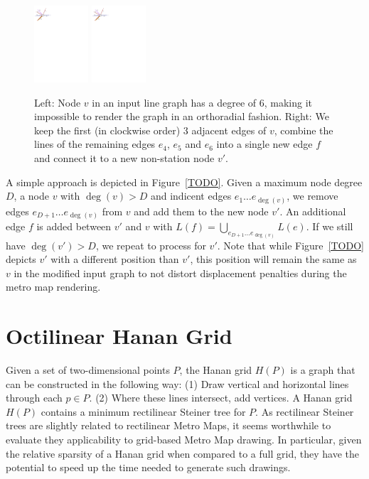 \documentclass[sigconf]{acmart}
\begin{document}
\begin{figure}
    \centering
	\hfill
	\includegraphics[width=0.18\textwidth]{figures2/nodesplit.pdf}
	\hfill
	\includegraphics[width=0.18\textwidth,page=2]{figures2/nodesplit.pdf}
	\hfill
	\caption{Left: Node $v$ in an input line graph has a degree of 6, making it impossible to render the graph in an orthoradial fashion. Right: We keep the first (in clockwise order) 3 adjacent edges of $v$, combine the lines of the remaining edges $e_4$, $e_5$ and $e_6$ into a single new edge $f$ and connect it to a new non-station node $v'$.}
	\label{FIG:orthoradgrid}
\end{figure}

A simple approach is depicted in Figure~\ref{TODO}.
Given a maximum node degree $D$, a node $v$ with $\deg(v) > D$ and indicent edges $e_1 \dots e_{\deg(v)}$, we remove edges $e_{D+1} \dots e_{\deg(v)}$ from $v$ and add them to the new node $v'$.
An additional edge $f$ is added between $v'$ and $v$ with $L(f) = \bigcup_{e_{D+1} \dots e_{\deg(v)}} L(e)$.
If we still have $\deg(v') > D$, we repeat to process for $v'$.
Note that while Figure~\ref{TODO} depicts $v'$ with a different position than $v'$, this position will remain the same as $v$ in the modified input graph to not distort displacement penalties during the metro map rendering.

\section{Octilinear Hanan Grid}

Given a set of two-dimensional points $P$, the Hanan grid $H(P)$ is a graph that can be constructed in the following way:
(1) Draw vertical and horizontal lines through each $p \in P$.
(2) Where these lines intersect, add vertices.
A Hanan grid $H(P)$ contains a minimum rectilinear Steiner tree for $P$.
As rectilinear Steiner trees are slightly related to rectilinear Metro Maps, it seems worthwhile to evaluate they applicability to grid-based Metro Map drawing.
In particular, given the relative sparsity of a Hanan grid when compared to a full grid, they have the potential to speed up the time needed to generate such drawings.
\end{document}
